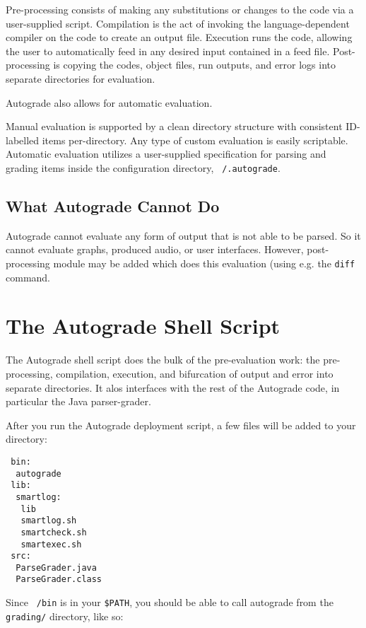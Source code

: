 \documentclass{article}
\begin{document}
Pre-processing consists of making any substitutions or changes to the code via
a user-supplied script.  Compilation is the act of invoking the
language-dependent compiler on the code to create an output file.  Execution
runs the code, allowing the user to automatically feed in any desired input
contained in a feed file.  Post-processing is copying the codes, object files,
run outputs, and error logs into separate directories for evaluation.

Autograde also allows for automatic evaluation.


Manual evaluation is supported by a clean directory structure with consistent
ID-labelled items per-directory.  Any type of custom evaluation is easily
scriptable.  Automatic evaluation utilizes a user-supplied specification for
parsing and grading items inside the configuration directory,
\texttt{~/.autograde}.

\subsection{What Autograde Cannot Do}

Autograde cannot evaluate any form of output that is not able to be parsed. So
it cannot evaluate graphs, produced audio, or user interfaces. However,
post-processing module may be added which does this evaluation (using e.g.  the
\texttt{diff} command.

\section{The Autograde Shell Script}

The Autograde shell script does the bulk of the pre-evaluation work: the
pre-processing, compilation, execution, and bifurcation of output and error
into separate directories. It alos interfaces with the rest of the Autograde
code, in particular the Java parser-grader.

After you run the Autograde deployment script, a few files will be added
to your directory:

\begin{verbatim}
 bin:
  autograde
 lib:
  smartlog:
   lib
   smartlog.sh
   smartcheck.sh
   smartexec.sh
 src:
  ParseGrader.java
  ParseGrader.class
\end{verbatim}

Since \texttt{~/bin} is in your \texttt{\$PATH}, you should be able to call
autograde from the \texttt{grading/} directory, like so:
\end{document}

